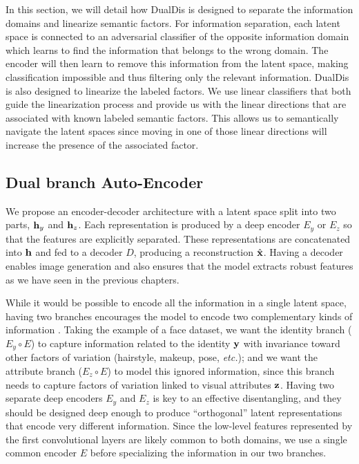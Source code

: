 In this section, we will detail how DualDis is designed to separate the information domains and linearize semantic factors. For information separation, each latent space is connected to an adversarial classifier of the opposite information domain which learns to find the information that belongs to the wrong domain. The encoder will then learn to remove this information from the latent space, making classification impossible and thus filtering only the relevant information. DualDis is also designed to linearize the labeled factors. We use linear classifiers that both guide the linearization process and provide us with the linear directions that are associated with known labeled semantic factors. This allows us to semantically navigate the latent spaces since moving in one of those linear directions will increase the presence of the associated factor.


\subsection{Dual branch Auto-Encoder}\label{dualdis:sec:model_ae}

We propose an encoder-decoder architecture with a latent space split into two parts, $\mathbf{h}_y$ and $\mathbf{h}_z$. Each representation is produced by a deep encoder $E_y$ or $E_z$ so that the features are explicitly separated. These representations are concatenated into $\mathbf{h}$ and fed to a decoder $D$, producing a reconstruction $\hat{\mathbf{x}}$. Having a decoder enables image generation and also ensures that the model extracts robust features \citep{le2018supervised} as we have seen in the previous chapters.

While it would be possible to encode all the information in a single latent space, having two branches encourages the model to encode two complementary kinds of information \citep{Mathieu2016,Hadad2018,Liu2018}. Taking the example of a face dataset, we want the identity branch ($E_y \circ E$) to capture information related to the identity $\mathbf{y}$ with invariance toward other factors of variation (hairstyle, makeup, pose, \textit{etc.}); and we want the attribute branch ($E_z \circ E$) to model this ignored information, since this branch needs to capture factors of variation linked to visual attributes $\mathbf{z}$. Having two separate deep encoders $E_y$ and $E_z$ is key to an effective disentangling, and they should be designed deep enough to produce ``orthogonal'' latent representations that encode very different information. Since the low-level features represented by the first convolutional layers are likely common to both domains, we use a single common encoder $E$ before specializing the information in our two branches.

